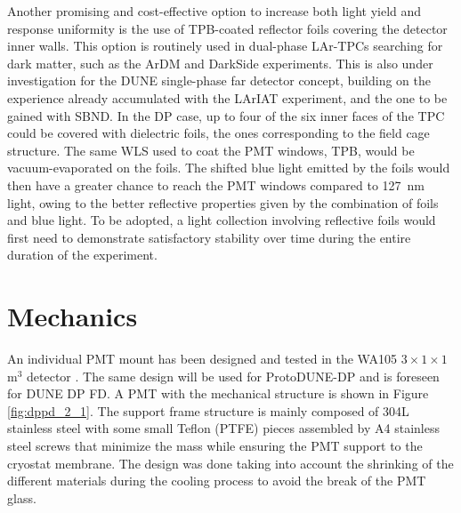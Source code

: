 Another promising and cost-effective option to increase both light yield and response uniformity is the use of TPB-coated reflector foils covering the detector inner walls. This option is routinely used in dual-phase LAr-TPCs searching for dark matter, such as the ArDM and DarkSide experiments. This is also under investigation for the DUNE single-phase far detector concept, building on the experience already accumulated with the LArIAT experiment, and the one to be gained with SBND. In the DP case, up to four of the six inner faces of the TPC could be covered with dielectric foils, the ones corresponding to the field cage structure. The same WLS used to coat the PMT windows, TPB, would be vacuum-evaporated on the foils. The shifted blue light emitted by the foils would then have a greater chance to reach the PMT windows compared to \SI{127}{nm} light, owing to the better reflective properties given by the combination of foils and blue light. To be adopted, a light collection involving reflective foils would first need to demonstrate satisfactory stability over time during the entire duration of the experiment.

\section{Mechanics}
\label{sec:fddp-pd-3}


An individual PMT mount has been designed and tested in the WA105 $3\times1\times1$\,m$^3$ detector \cite{Zambelli:2017dkg}. The same design will be used for ProtoDUNE-DP and is foreseen for DUNE DP FD. A PMT with the mechanical structure is shown in Figure \ref{fig:dppd_2_1}. The support frame structure is mainly composed of \num{304}L stainless steel with some small Teflon (PTFE) pieces assembled by A4 stainless steel screws that minimize the mass while ensuring the PMT support to the cryostat membrane. The design was done taking into account the shrinking of the different materials during the cooling process to avoid the break of the PMT glass.


